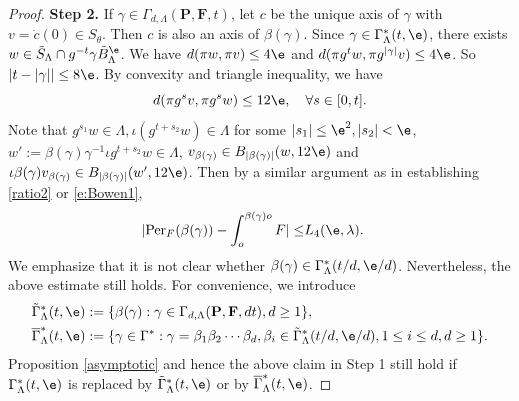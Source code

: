 \documentclass[11pt]{amsart}
\theoremstyle{definition}
\def\b{\beta}
\def\c{\gamma}   \def\C{\Gamma}
\def\l{\lambda}   \def\L{\Lambda}
\def\bP{\textbf{P}}
\def\bF{\textbf{F}}
\newcommand{\Per}{\mathrm{Per}}
\begin{document}
\begin{proof}
\textbf{Step 2.} 
If $\c\in \C_{d,\L}(\bP, \bF, t)$, let $c$ be the unique axis of $\c$ with $v=\dot c(0)\in S_\theta$. Then $c$ is also an axis of $\b(\c)$. Since $\c\in \C^*_\L(t,\e)$, there exists $w\in \tilde S_\L\cap g^{-t}\c \tilde B_\L^\e$. We have $d(\pi w, \pi v)\le 4\e$ and $d(\pi g^tw, \pi g^{|\c|}v)\le 4\e$. So $|t-|\c||\le 8\e$. By convexity and triangle inequality, we have
\[d(\pi g^{s}v, \pi g^sw)\le 12\e, \quad \forall s\in [0,t].\]
Note that $g^{s_1}w\in \L, \iota(g^{t+s_2}w)\in \L$ for some $|s_1|\le \e^2, |s_2|<\e$, $w':=\b(\c)\c^{-1}\iota g^{t+s_2}w\in \L$, $v_{\b(\c)}\in B_{|\b(\c)|}(w,12\e)$ and $\iota\b(\c)v_{\b(\c)}\in B_{|\b(\c)|}(w',12\e)$. Then by a similar argument as in establishing \eqref{ratio2} or \eqref{e:Bowen1},
\begin{equation}\label{ratio4}
\begin{aligned}
|\Per_F(\b(\c))-\int_{o}^{\b(\c) o}F|\le &L_4(\e,\l).
\end{aligned}
\end{equation}
We emphasize that it is not clear whether $\b(\c)\in \C^*_\L(t/d,\e/d)$. Nevertheless, the above estimate still holds. For convenience, we introduce
\begin{equation*}
\begin{aligned}
\tilde\C^*_\L(t,\e)&:=\{\b(\c):\c\in \C_{d,\L}(\bP, \bF, dt), d\ge 1\},\\
\overline\C^*_\L(t,\e)&:=\{\c\in \C^*: \c=\b_1\b_2\cdots\b_d, \b_i\in \tilde\C^*_\L(t/d,\e/d), 1\le i\le d, d\ge 1\}.
\end{aligned}
\end{equation*}
Proposition \ref{asymptotic} and hence the above claim in Step 1 still hold if $\C^*_\L(t,\e)$ is replaced by $\tilde\C^*_\L(t,\e)$ or by $\overline\C^*_\L(t,\e)$. 


\end{proof}
\end{document}
